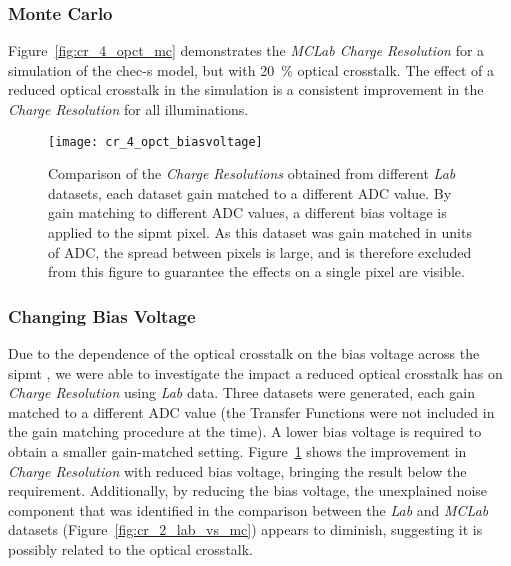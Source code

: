 \subsubsection{Monte Carlo}

Figure~\ref{fig:cr_4_opct_mc} demonstrates the \textit{MCLab Charge Resolution} for a simulation of the \gls{chec-s} model, but with \SI{20}{\percent} optical crosstalk. The effect of a reduced optical crosstalk in the simulation is a consistent improvement in the \textit{Charge Resolution} for all illuminations.

\begin{figure}[H]
	\centering
    \texttt{[image: cr\_4\_opct\_biasvoltage]} 
	\caption[Comparison of the \textit{Lab Charge Resolution} with different bias voltages applied to the \gls{sipmt} pixel.]{Comparison of the \textit{Charge Resolutions} obtained from different \textit{Lab} datasets, each dataset gain matched to a different ADC value. By gain matching to different ADC values, a different bias voltage is applied to the \gls{sipmt} pixel. As this dataset was gain matched in units of ADC, the spread between pixels is large, and is therefore excluded from this figure to guarantee the effects on a single pixel are visible.}
	\label{fig:cr_4_opct_biasvoltage}
\end{figure}

\subsubsection{Changing Bias Voltage}

Due to the dependence of the optical crosstalk on the bias voltage across the \gls{sipmt} , we were able to investigate the impact a reduced optical crosstalk has on \textit{Charge Resolution} using \textit{Lab} data. Three datasets were generated, each gain matched to a different ADC value (the Transfer Functions were not included in the gain matching procedure at the time). A lower bias voltage is required to obtain a smaller gain-matched setting. Figure~\ref{fig:cr_4_opct_biasvoltage} shows the improvement in \textit{Charge Resolution} with reduced bias voltage, bringing the result below the requirement. Additionally, by reducing the bias voltage, the unexplained noise component that was identified in the comparison between the \textit{Lab} and \textit{MCLab} datasets (Figure~\ref{fig:cr_2_lab_vs_mc}) appears to diminish, suggesting it is possibly related to the optical crosstalk.

